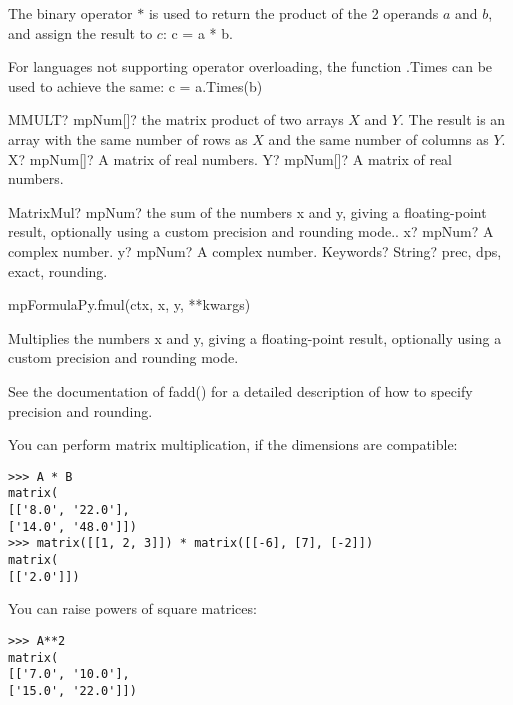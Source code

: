 \vspace{0.3cm}
The binary operator $*$ is used to return the product of the 2 operands $a$ and $b$, and assign the result to $c$: \textsf{c = a * b}.

For languages not supporting operator overloading, the function \textsf{.Times} can be used to achieve the same: \textsf{c = a.Times(b)}


\begin{mpFunctionsExtract}
	\mpWorksheetFunctionTwoNotImplemented
	{MMULT? mpNum[]? the matrix product of two arrays $X$ and $Y$. The result is an array with the same number of rows as $X$ and the same number of columns as $Y$.}
	{X? mpNum[]? A matrix of real numbers.}
	{Y? mpNum[]? A matrix of real numbers.}
\end{mpFunctionsExtract}




\vspace{0.3cm}
\begin{mpFunctionsExtract}
	\mpFunctionThree
	{MatrixMul? mpNum? the sum of the numbers x and y, giving a floating-point result, optionally using a custom precision and rounding mode..}
	{x? mpNum? A complex number.}
	{y? mpNum? A complex number.}
	{Keywords? String? prec, dps, exact, rounding.}	
\end{mpFunctionsExtract}


mpFormulaPy.fmul(ctx, x, y, **kwargs)

\vpara
Multiplies the numbers x and y, giving a floating-point result, optionally using a custom precision and rounding mode.

\vpara
See the documentation of fadd() for a detailed description of how to specify precision and rounding.




You can perform matrix multiplication, if the dimensions are compatible:

\begin{lstlisting}
>>> A * B
matrix(
[['8.0', '22.0'],
['14.0', '48.0']])
>>> matrix([[1, 2, 3]]) * matrix([[-6], [7], [-2]])
matrix(
[['2.0']])
\end{lstlisting}

You can raise powers of square matrices:

\begin{lstlisting}
>>> A**2
matrix(
[['7.0', '10.0'],
['15.0', '22.0']])
\end{lstlisting}



